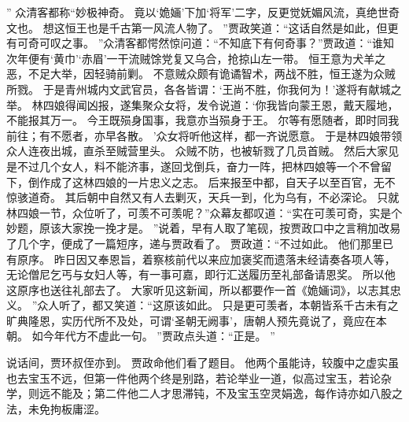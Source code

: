 ”
众清客都称“妙极神奇。
竟以‘姽婳’下加‘将军’二字，反更觉妩媚风流，真绝世奇文也。
想这恒王也是千古第一风流人物了。
”贾政笑道：“这话自然是如此，但更有可奇可叹之事。
”众清客都愕然惊问道：“不知底下有何奇事？”贾政道：“谁知次年便有‘黄巾’‘赤眉’一干流贼馀党复又乌合，抢掠山左一带。
恒王意为犬羊之恶，不足大举，因轻骑前剿。
不意贼众颇有诡谲智术，两战不胜，恒王遂为众贼所戮。
于是青州城内文武官员，各各皆谓：‘王尚不胜，你我何为！’遂将有献城之举。
林四娘得闻凶报，遂集聚众女将，发令说道：‘你我皆向蒙王恩，戴天履地，不能报其万一。
今王既殒身国事，我意亦当殒身于王。
尔等有愿随者，即时同我前往；有不愿者，亦早各散。
’众女将听他这样，都一齐说愿意。
于是林四娘带领众人连夜出城，直杀至贼营里头。
众贼不防，也被斩戮了几员首贼。
然后大家见是不过几个女人，料不能济事，遂回戈倒兵，奋力一阵，把林四娘等一个不曾留下，倒作成了这林四娘的一片忠义之志。
后来报至中都，自天子以至百官，无不惊骇道奇。
其后朝中自然又有人去剿灭，天兵一到，化为乌有，不必深论。
只就林四娘一节，众位听了，可羡不可羡呢？”众幕友都叹道：“实在可羡可奇，实是个妙题，原该大家挽一挽才是。
”说着，早有人取了笔砚，按贾政口中之言稍加改易了几个字，便成了一篇短序，递与贾政看了。
贾政道：“不过如此。
他们那里已有原序。
昨日因又奉恩旨，着察核前代以来应加褒奖而遗落未经请奏各项人等，无论僧尼乞丐与女妇人等，有一事可嘉，即行汇送履历至礼部备请恩奖。
所以他这原序也送往礼部去了。
大家听见这新闻，所以都要作一首《姽婳词》，以志其忠义。
”众人听了，都又笑道：“这原该如此。
只是更可羡者，本朝皆系千古未有之旷典隆恩，实历代所不及处，可谓‘圣朝无阙事’，唐朝人预先竟说了，竟应在本朝。
如今年代方不虚此一句。
”贾政点头道：“正是。
”\par
说话间，贾环叔侄亦到。
贾政命他们看了题目。
他两个虽能诗，较腹中之虚实虽也去宝玉不远，但第一件他两个终是别路，若论举业一道，似高过宝玉，若论杂学，则远不能及；第二件他二人才思滞钝，不及宝玉空灵娟逸，每作诗亦如八股之法，未免拘板庸涩。
